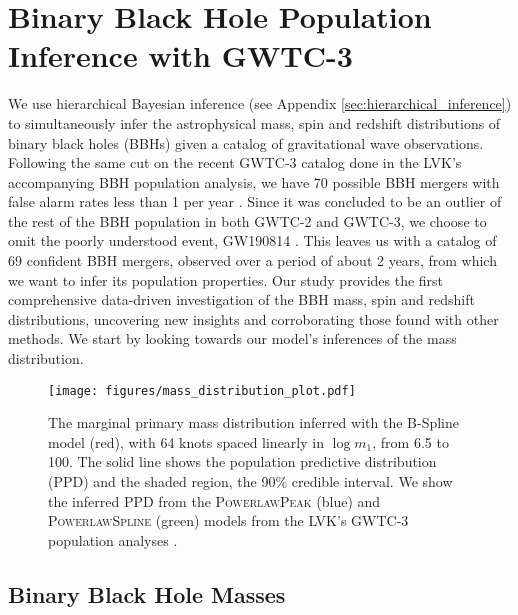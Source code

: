 \section{Binary Black Hole Population Inference with GWTC-3} \label{sec:results}

We use hierarchical Bayesian inference (see Appendix \ref{sec:hierarchical_inference}) to simultaneously infer the astrophysical mass, spin and redshift distributions of 
binary black holes (BBHs) given a catalog of gravitational wave observations. Following the same cut on the recent GWTC-3 catalog done in the LVK's 
accompanying BBH population analysis, we have 70 possible BBH mergers with false alarm rates less than 1 per year \citep{GWTC3,o3b_astro_dist}. Since it was concluded to be an outlier of the rest of 
the BBH population in both GWTC-2 and GWTC-3, we choose to omit the poorly understood event, GW190814 \citep{190814disc,o3a_pop,o3b_astro_dist,Essick_2022}. This leaves us with 
a catalog of 69 confident BBH mergers, observed over a period of about 2 years, from which we want to infer its population properties. Our study provides the first comprehensive 
data-driven investigation of the BBH mass, spin and redshift distributions, uncovering new insights and corroborating those found with other methods. 
We start by looking towards our model's inferences of the mass distribution.

\begin{figure*}[ht!]
    \begin{centering}
        \texttt{[image: figures/mass\_distribution\_plot.pdf]}
        \caption{The marginal primary mass distribution inferred with the B-Spline model (red), with 64 knots spaced linearly in $\log m_1$, from 6.5\msun 
        to 100\msun. The solid line shows the population predictive distribution (PPD) and the shaded region, 
        the 90\% credible interval. We show the inferred PPD from the \textsc{PowerlawPeak} (blue) and \textsc{PowerlawSpline} (green) models 
        from the LVK's GWTC-3 population analyses \citep{o3b_astro_dist}.}
        \label{fig:mass_distribution}
    \end{centering}
\end{figure*}

\subsection{Binary Black Hole Masses} \label{sec:mass_dist}

